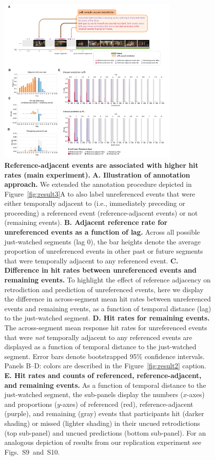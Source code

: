 \documentclass[10pt]{article}
\newcommand{\refAdjacent}{S9}
\newcommand{\refAdjacentCorrected}{S10}
\begin{document}
\begin{figure}[tp]
  \centering
  \includegraphics[width=0.8\textwidth]{results4}

  \caption{\textbf{Reference-adjacent events are associated with higher hit rates (main experiment).} \textbf{A. Illustration of annotation approach.} We extended the annotation procedure depicted in Figure~\ref{fig:result3}A to also label unreferenced events that were either temporally adjacent to (i.e., immediately preceding or proceeding) a referenced event (reference-adjacent events) or not (remaining events). \textbf{B. Adjacent reference rate for unreferenced events as a function of lag.} Across all possible just-watched segments (lag 0), the bar heights denote the average proportion of unreferenced events in other past or future segments that were temporally adjacent to any referenced event. \textbf{C. Difference in hit rates between unreferenced events and remaining events.} To highlight the effect of reference adjacency on retrodiction and prediction of unreferenced events, here we display the difference in across-segment mean hit rates between unreferenced events and remaining events, as a function of temporal distance (lag) to the just-watched segment. \textbf{D. Hit rates for remaining events.} The across-segment mean response hit rates for unreferenced events that were \textit{not} temporally adjacent to any referenced events are displayed as a function of temporal distance to the just-watched segment. Error bars denote bootstrapped 95\% confidence intervals. Panels B--D: colors are described in the Figure~\ref{fig:result2} caption. \textbf{E. Hit rates and counts of referenced, reference-adjacent, and remaining events.} As a function of temporal distance to the just-watched segment, the sub-panels display the numbers ($x$-axes) and proportions ($y$-axes) of referenced (red), reference-adjacent (purple), and remaining (gray) events that participants hit (darker shading) or missed (lighter shading) in their uncued retrodictions (top sub-panel) and uncued predictions (bottom sub-panel). For an analogous depiction of results from our replication experiment see Figs.~\refAdjacent~and~\refAdjacentCorrected.}

  \label{fig:result4}
\end{figure}
\end{document}
